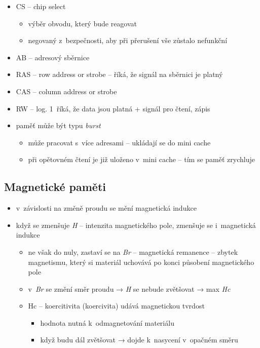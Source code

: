 \documentclass[a4paper,12pt]{article}
\providecommand{\tightlist}{%
\setlength{\itemsep}{0pt}\setlength{\parskip}{0pt}}
\begin{document}
\begin{itemize}
\tightlist
\item CS -- chip select
  \begin{itemize}
  \tightlist
  \item výběr obvodu, který bude reagovat
  \item negovaný z~bezpečnosti, aby při přerušení vše zůstalo nefunkční
  \end{itemize}
\item AB -- adresový sběrnice
\item RAS -- row address or strobe -- říká, že signál na sběrnici je platný
\item CAS -- column address or strobe
\item RW -- log. 1~říká, že data jsou platná + signál pro čtení, zápis
\item paměť může být typu \emph{burst}

  \begin{itemize}
  \tightlist
  \item může pracovat s~více adresami -- ukládají se do mini cache
  \item při opětovném čtení je již uloženo v~mini cache -- tím se paměť
    zrychluje
  \end{itemize}
\end{itemize}

\subsection{Magnetické paměti}

\begin{itemize}
\tightlist
\item v~závislosti na změně proudu se mění magnetická indukce
\item když se zmenšuje \emph{H} -- intenzita magnetického pole, zmenšuje se
  i~magnetická indukce

  \begin{itemize}
    \tightlist
  \item ne však do nuly, zastaví se na \emph{Br} -- magnetická remanence --
    zbytek magnetismu, který si materiál uchovává po konci působení
    magnetického pole
  \item v~\emph{Br} se změní směr proudu → \emph{H} se nebude zvětšovat →
    max \emph{Hc}
  \item Hc -- koercitivita (koercivita) udává magnetickou tvrdost

    \begin{itemize}
    \tightlist
    \item hodnota nutná k~odmagnetování materiálu
    \item když budu dál zvětšovat → dojde k~nasycení v~opačném směru
    \end{itemize}
  \end{itemize}
\end{itemize}
\end{document}
